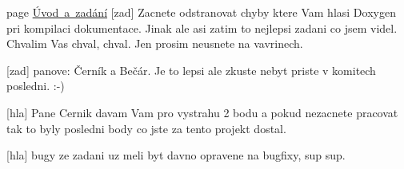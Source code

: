 
\begin{DoxyRefList}
\item[page \mbox{\hyperlink{index}{Úvod a zadání}} ]\label{bug__bug000001}%
%
\mbox{[}zad\mbox{]} Zacnete odstranovat chyby ktere Vam hlasi Doxygen pri kompilaci dokumentace. Jinak ale asi zatim to nejlepsi zadani co jsem videl. Chvalim Vas chval, chval. Jen prosim neusnete na vavrinech.

\label{bug__bug000002}%
%
\mbox{[}zad\mbox{]} panove\+: Černík a Bečár. Je to lepsi ale zkuste nebyt priste v komitech posledni. \+:-\/)

\label{bug__bug000003}%
%
\mbox{[}hla\mbox{]} Pane Cernik davam Vam pro vystrahu 2 bodu a pokud nezacnete pracovat tak to byly posledni body co jste za tento projekt dostal.

\label{bug__bug000004}%
%
\mbox{[}hla\mbox{]} bugy ze zadani uz meli byt davno opravene na bugfixy, sup sup.
\end{DoxyRefList}